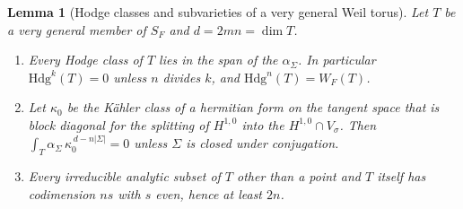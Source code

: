 \documentclass[11pt,reqno]{amsart}
\theoremstyle{plain}
\newtheorem{lemma}[theorem]{Lemma}
\theoremstyle{definition}
\theoremstyle{remark}
\newcommand{\Hdg}{\mathrm{Hdg}}
\begin{document}
\begin{lemma}[Hodge classes and subvarieties of a very general Weil torus]
\label{lem:cmweiltori}
Let $T$ be a very general member of $S_{F}$ and $d=2mn=\dim T$.
\begin{enumerate}[label=\textup{(\roman*)},leftmargin=2.6em,itemsep=2pt]
\item Every Hodge class of $T$ lies in the span of the $\alpha_{\Sigma}$. In
  particular $\Hdg^{k}(T)=0$ unless $n$ divides $k$, and
  $\Hdg^{n}(T)=W_{F}(T)$.
\item Let $\kappa_{0}$ be the K\"ahler class of a hermitian form on the
  tangent space that is block diagonal for the splitting of $H^{1,0}$ into
  the $H^{1,0}\cap V_{\sigma}$. Then $\int_{T}\alpha_{\Sigma}\,
  \kappa_{0}^{\,d-n|\Sigma|}=0$ unless $\Sigma$ is closed under conjugation.
\item Every irreducible analytic subset of $T$ other than a point and $T$
  itself has codimension $ns$ with $s$ even, hence at least $2n$.
\end{enumerate}
\end{lemma}
\end{document}
